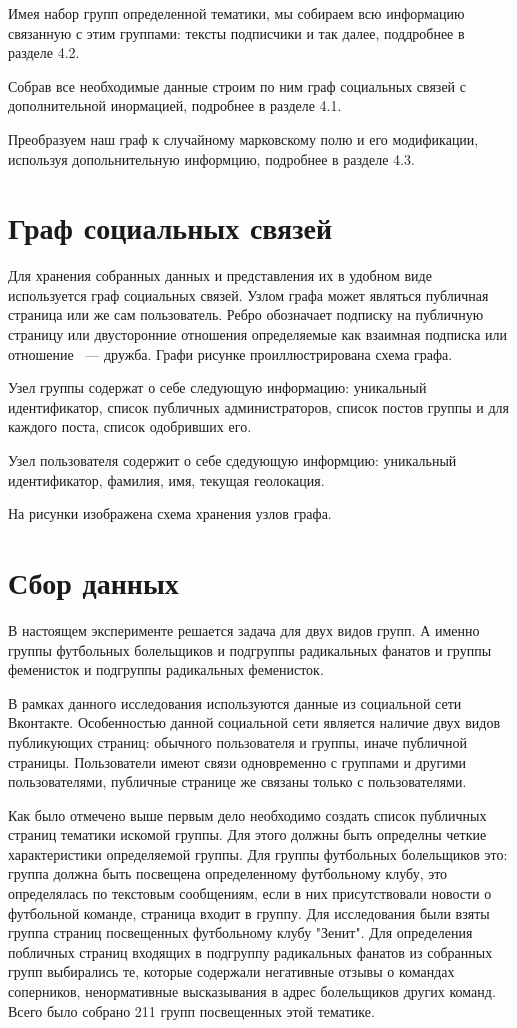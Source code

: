 \documentclass[annotation,times,page4]{itmo-student-thesis}
\begin{document}
Имея набор групп определенной тематики, мы собираем всю информацию связанную с этим группами: тексты подписчики и так далее, поддробнее в разделе 4.2.

Собрав все необходимые данные строим по ним граф социальных связей с дополнительной инормацией, подробнее в разделе 4.1.

Преобразуем наш граф к случайному марковскому полю и его модификации, используя допольнительную информцию, подробнее в разделе 4.3.


   
\section{Граф социальных связей}
Для хранения собранных данных и представления их в удобном виде используется граф социальных связей.
Узлом графа может являться публичная страница или же сам пользователь. Ребро обозначает подписку на публичную страницу или двусторонние отношения определяемые как взаимная подписка или отношение ~--- дружба. Графи рисунке проиллюстрирована схема графа.

Узел группы содержат о себе следующую информацию: уникальный идентификатор, список публичных администраторов, список постов группы и для каждого поста, список одобривших его.

Узел пользователя содержит о себе сдедующую информцию: уникальный идентификатор, фамилия, имя, текущая геолокация.

На рисунки изображена схема хранения узлов графа.    

\section{Сбор данных}
В настоящем эксперименте решается задача для двух видов групп. А именно группы футбольных болельщиков и подгруппы радикальных фанатов и группы феменисток и подгруппы радикальных феменисток. 

В рамках данного исследования используются данные из социальной сети Вконтакте. Особенностью данной социальной сети является наличие двух видов публикующих страниц: обычного пользователя и группы, иначе публичной страницы. Пользователи имеют связи одновременно с группами и другими пользователями, публичные странице же связаны только с пользователями. 

Как было отмечено выше первым дело необходимо создать список публичных страниц тематики искомой группы. 
Для этого должны быть определны четкие характеристики определяемой группы.
Для группы футбольных болельщиков это: группа должна быть посвещена определенному футбольному клубу, это определялась по текстовым сообщениям, если в них присутствовали новости о футбольной команде, страница входит в группу. Для исследования были взяты группа страниц посвещенных футбольному клубу "Зенит". Для определения побличных страниц входящих в подгруппу радикальных фанатов из собранных групп выбирались те, которые  содержали негативные отзывы о командах соперников, ненормативные высказывания в адрес болельщиков других команд. Всего было собрано 211 групп посвещенных этой тематике.
\end{document}
